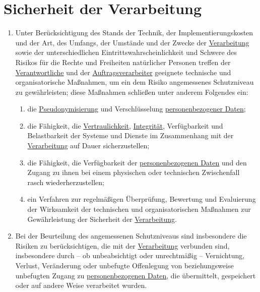 \chapter{Sicherheit der Verarbeitung}
\label{ch:32}


\begin{enumerate}

  \item Unter Berücksichtigung des Stands der Technik, der Implementierungskosten und der Art, des Umfangs, der Umstände
   und der Zwecke der \hyperref[itm:04-2]{Verarbeitung} sowie der unterschiedlichen Eintrittswahrscheinlichkeit und
   Schwere des Risikos für die Rechte und Freiheiten natürlicher Personen treffen der \hyperref[itm:04-7]
   {Verantwortliche} und der \hyperref[itm:04-8]{Auftragsverarbeiter} geeignete technische und organisatorische
   Maßnahmen, um ein dem Risiko angemessenes Schutzniveau zu gewährleisten; diese Maßnahmen schließen unter anderem
   Folgendes ein:
  \label{itm:32-1}

  \begin{enumerate}
  
    \item die \hyperref[itm:04-5]{Pseudonymisierung} und Verschlüsselung \hyperref[itm:04-1]{personenbezogener Daten};
    \label{itm:32-1a}

    \item die Fähigkeit, die \hyperref[itm:05-1f]{Vertraulichkeit}, \hyperref[itm:05-1f]{Integrität}, Verfügbarkeit und
     Belastbarkeit der Systeme und Dienste im Zusammenhang mit der \hyperref[itm:04-2]{Verarbeitung} auf Dauer
     sicherzustellen;
    \label{itm:32-1b}

    \item die Fähigkeit, die Verfügbarkeit der \hyperref[itm:04-1]{personenbezogenen Daten} und den Zugang zu ihnen bei
     einem physischen oder technischen Zwischenfall rasch wiederherzustellen;
    \label{itm:32-1c}

    \item ein Verfahren zur regelmäßigen Überprüfung, Bewertung und Evaluierung der Wirksamkeit der technischen und
     organisatorischen Maßnahmen zur Gewährleistung der Sicherheit der \hyperref[itm:04-2]{Verarbeitung}.
    \label{itm:32-1d}

  \end{enumerate}

  \item Bei der Beurteilung des angemessenen Schutzniveaus sind insbesondere die Risiken zu berücksichtigen, die mit
   der
   \hyperref[itm:04-2]{Verarbeitung} verbunden sind, insbesondere durch -- ob unbeabsichtigt oder unrechtmäßig --
    Vernichtung, Verlust, Veränderung oder unbefugte Offenlegung von beziehungsweise unbefugten Zugang zu \hyperref
    [itm:04-1]{personenbezogenen Daten}, die übermittelt, gespeichert oder auf andere Weise verarbeitet wurden.
  \label{itm:32-2}


\end{enumerate}
